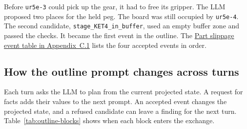 \documentclass[preprint,12pt,authoryear]{elsarticle}
\let\code\nolinkurl
\begin{document}
Before \code{ur5e-3} could pick up the gear, it had to free its gripper.
The LLM proposed two places for the held peg. The board was still occupied
by \code{ur5e-4}. The second candidate, \code{stage_KET4_in_buffer}, used an
empty buffer zone and passed the checks. It became the first event in the
outline. The \hyperref[sec:gazebo-slippage]{Part slippage event table in
Appendix~C.1} lists the four accepted events in order.

\subsection{How the outline prompt changes across turns}\label{sec:outline-feedback}

Each turn asks the LLM to plan from the current projected state. A request for
facts adds their values to the next prompt. An accepted event changes the
projected state, and a refused candidate can leave a finding for the next turn.
Table~\ref{tab:outline-blocks} shows when each block enters the exchange.
\end{document}

